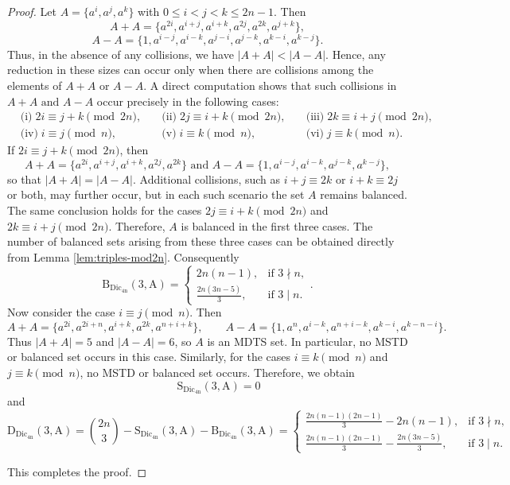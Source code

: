 \documentclass[11pt,reqno]{amsart}
\numberwithin{equation}{section}
\begin{document}
\begin{proof}
 Let $A=\{a^{i},a^{j},a^{k}\}$ with $0 \leq i<j< k\leq 2n-1$. Then
$$A+A=\{a^{2i},a^{i+j},a^{i+k},a^{2j},a^{2k},a^{j+k}\},$$ 
$$A-A=\{1,a^{i-j},a^{i-k},a^{j-i},a^{j-k},a^{k-i},a^{k-j}\}.$$ Thus, in the absence of any collisions, we have $|A+A|<|A-A|$. Hence, any reduction in these sizes can occur only when there are collisions among the elements of $A+A$ or $A-A$.
A direct computation shows that such collisions in $A+A\text{ and }A-A$ occur precisely in the following cases:
\begin{align*}
&\text{(i)}\; 2i \equiv j+k \pmod{2n}, \quad
&\text{(ii)}\; 2j \equiv i+k \pmod{2n}, \quad
&\text{(iii)}\; 2k \equiv i+j \pmod{2n},\\
&\text{(iv)}\; i \equiv j \pmod{n}, \qquad
&\text{(v)}\; i \equiv k \pmod{n}, \qquad
&\text{(vi)}\; j \equiv k \pmod{n}. 
\end{align*}
If $2i \equiv j+k\pmod{2n}$, then $$A+A=\{a^{2i},a^{i+j},a^{i+k},a^{2j},a^{2k}\} \text{ and } A-A=\{1,a^{i-j},a^{i-k},a^{j-k},a^{k-j}\},$$ so that $|A+A|=|A-A|$. Additional collisions, such as  $i+j\equiv 2k$ or $i+k\equiv 2j$ or both, may further occur, but in each such scenario the set $A$  remains balanced. The same conclusion holds for the cases $2j\equiv i+k \pmod{2n}$ and $2k \equiv i+j \pmod{2n}$. Therefore, $A$ is balanced in the first three cases.  The number of balanced sets arising from these three cases can be obtained directly from Lemma \ref{lem:triples-mod2n}. Consequently
$$ \mathrm{B_{\mathrm{Dic_{4n}}}(3,A)}=\begin{cases}
2n(n-1), & \text{if } 3\nmid n,\\[6pt]
\frac{2n(3n-5)}{3}, & \text{if } 3\mid n.
\end{cases}.$$
Now consider the case $ i \equiv j \pmod{n}$. Then $$A+A=\{a^{2i},a^{2i+n},a^{i+k},a^{2k},a^{n+i+k}\}, \qquad A-A=\{1,a^{n},a^{i-k},a^{n+i-k},a^{k-i},a^{k-n-i}\}.$$  Thus $|A+A|=5$ and $|A-A|=6$, so  $A$ is an MDTS set. In particular, no MSTD or balanced set occurs in this case. Similarly, for the cases $ i \equiv k \pmod{n}$ and $ j \equiv k \pmod{n}$, no MSTD or balanced set occurs. Therefore, we obtain 
$$\qquad \mathrm{S_{\mathrm{Dic_{4n}}}(3,A)}=0$$ 
and  $$\mathrm{D_{\mathrm{Dic_{4n}}}(3,A)}=\binom{2n}{3}-\mathrm{S_{\mathrm{Dic_{4n}}}(3,A)}-\mathrm{B_{\mathrm{Dic_{4n}}}(3,A)}=\begin{cases}
\frac{2n(n-1)(2n-1)}{3}-2n(n-1), & \text{if } 3\nmid n,\\[6pt]
\frac{2n(n-1)(2n-1)}{3}-\frac{2n(3n-5)}{3}, & \text{if } 3\mid n.
\end{cases}$$

This completes the proof.
\end{proof}
\end{document}
